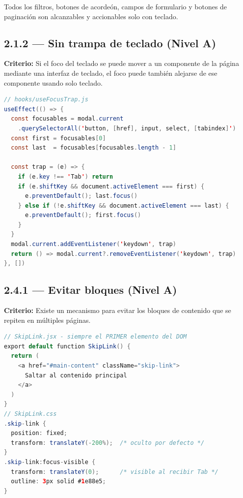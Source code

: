 \documentclass[12pt, a4paper]{article}
\begin{document}
Todos los filtros, botones de acordeón, campos de formulario y botones de paginación son alcanzables y accionables solo con teclado.

\subsection{2.1.2 --- Sin trampa de teclado (Nivel A)}

\textbf{Criterio:} Si el foco del teclado se puede mover a un componente de la página mediante una interfaz de teclado, el foco puede también alejarse de ese componente usando solo teclado.

\begin{evidbox}
\begin{lstlisting}[language=Java]
// hooks/useFocusTrap.js
useEffect(() => {
  const focusables = modal.current
    .querySelectorAll('button, [href], input, select, [tabindex]')
  const first = focusables[0]
  const last  = focusables[focusables.length - 1]

  const trap = (e) => {
    if (e.key !== 'Tab') return
    if (e.shiftKey && document.activeElement === first) {
      e.preventDefault(); last.focus()
    } else if (!e.shiftKey && document.activeElement === last) {
      e.preventDefault(); first.focus()
    }
  }
  modal.current.addEventListener('keydown', trap)
  return () => modal.current?.removeEventListener('keydown', trap)
}, [])
\end{lstlisting}
\end{evidbox}

\subsection{2.4.1 --- Evitar bloques (Nivel A)}

\textbf{Criterio:} Existe un mecanismo para evitar los bloques de contenido que se repiten en múltiples páginas.

\begin{evidbox}
\begin{lstlisting}[language=Java]
// SkipLink.jsx - siempre el PRIMER elemento del DOM
export default function SkipLink() {
  return (
    <a href="#main-content" className="skip-link">
      Saltar al contenido principal
    </a>
  )
}
// SkipLink.css
.skip-link {
  position: fixed;
  transform: translateY(-200%);  /* oculto por defecto */
}
.skip-link:focus-visible {
  transform: translateY(0);      /* visible al recibir Tab */
  outline: 3px solid #1e88e5;
}
\end{lstlisting}
\end{evidbox}
\end{document}
